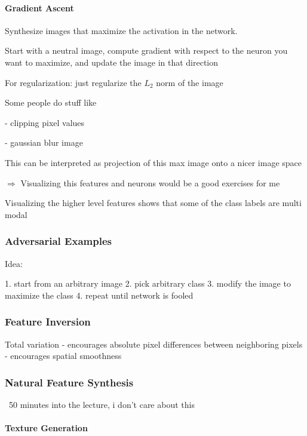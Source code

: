 \paragraph{Gradient Ascent}

Synthesize images that maximize the activation in the network.

Start with a neutral image, compute gradient with respect to the neuron you want to maximize, and update the image in that direction

For regularization: just regularize the $L_2$ norm of the image

Some people do stuff like 

- clipping pixel values

- gaussian blur image

This can be interpreted as projection of this max image onto a nicer image space

$\Rightarrow$ Visualizing this features and neurons would be a good exercises for me

Visualizing the higher level features shows that some of the class labels are multi modal

\subsubsection{Adversarial Examples}

Idea: 

1. start from an arbitrary image
2. pick arbitrary class
3. modify the image to maximize the class
4. repeat until network is fooled

\subsubsection{Feature Inversion}

Total variation - encourages absolute pixel differences between neighboring pixels - encourages spatial smoothness

\subsubsection{Natural Feature Synthesis}

~50 minutes into the lecture, i don't care about this

\paragraph{Texture Generation}

